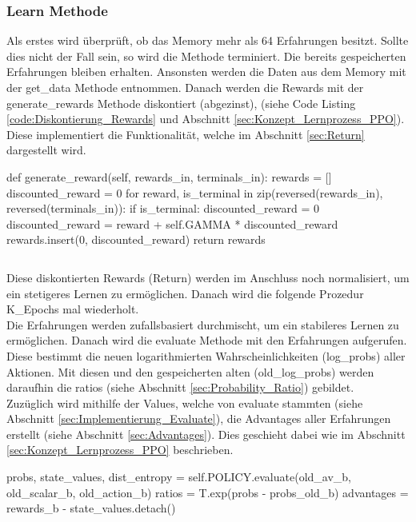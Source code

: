 \subsubsection{Learn Methode} \label{sec:Implementierung_learn_PPO}
Als erstes wird überprüft, ob das Memory mehr als 64 Erfahrungen besitzt. Sollte dies nicht der Fall sein, so wird die Methode terminiert. 
Die bereits gespeicherten Erfahrungen bleiben erhalten.
Ansonsten werden die Daten aus dem Memory mit der get\_data Methode entnommen.
Danach werden die Rewards mit der generate\_rewards Methode diskontiert (abgezinst), (siehe Code Listing \ref{code:Diskontierung_Rewards} und Abschnitt \ref{sec:Konzept_Lernprozess_PPO}). Diese implementiert die Funktionalität, welche im Abschnitt \ref{sec:Return} dargestellt wird.
\begin{python}
def generate_reward(self, rewards_in, terminals_in):
	rewards = []
	discounted_reward = 0
	for reward, is_terminal in zip(reversed(rewards_in), reversed(terminals_in)):
		if is_terminal:
			discounted_reward = 0
		discounted_reward = reward + self.GAMMA * discounted_reward
		rewards.insert(0, discounted_reward)
	return rewards
\end{python}
\begin{lstlisting}[caption=Diskontierung der Rewards, label=code:Diskontierung_Rewards]
\end{lstlisting}
Diese diskontierten Rewards (Return) werden im Anschluss noch normalisiert, um ein stetigeres Lernen zu ermöglichen.
Danach wird die folgende Prozedur K\_Epochs mal wiederholt.\\
Die Erfahrungen werden zufallsbasiert durchmischt, um ein stabileres Lernen zu ermöglichen. 
Danach wird die evaluate Methode mit den Erfahrungen aufgerufen. Diese bestimmt die neuen logarithmierten Wahrscheinlichkeiten (log\_probs) aller Aktionen. Mit diesen und den gespeicherten alten (old\_log\_probs) werden daraufhin die ratios (siehe Abschnitt \ref{sec:Probability_Ratio}) gebildet.\\
Zuzüglich wird mithilfe der Values, welche von evaluate stammten (siehe Abschnitt \ref{sec:Implementierung_Evaluate}), die Advantages aller Erfahrungen erstellt (siehe Abschnitt \ref{sec:Advantages}). Dies geschieht dabei wie im Abschnitt \ref{sec:Konzept_Lernprozess_PPO} beschrieben.
\begin{python}		
probs, state_values, dist_entropy = self.POLICY.evaluate(old_av_b, old_scalar_b, old_action_b)	
ratios = T.exp(probs - probs_old_b)	
advantages = rewards_b - state_values.detach()
\end{python}
